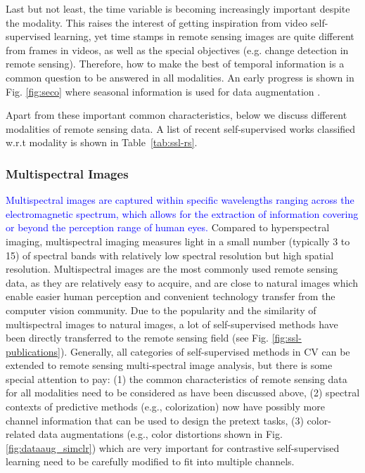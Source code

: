 \documentclass[lettersize,journal]{IEEEtran}
\begin{document}
Last but not least, the time variable is becoming increasingly important despite the modality. This raises the interest of getting inspiration from video self-supervised learning, yet time stamps in remote sensing images are quite different from frames in videos, as well as the special objectives (e.g. change detection in remote sensing). Therefore, how to make the best of temporal information is a common question to be answered in all modalities. An early progress is shown in Fig. \ref{fig:seco} where seasonal information is used for data augmentation \cite{manas2021seasonal}.

Apart from these important common characteristics, below we discuss different modalities of remote sensing data. A list of recent self-supervised works classified w.r.t modality is shown in Table~\ref{tab:ssl-rs}.





\subsubsection{Multispectral Images}

\textcolor{blue}{Multispectral images are captured within specific wavelengths ranging across the electromagnetic spectrum, which allows for the extraction of information covering or beyond the perception range of human eyes.} Compared to hyperspectral imaging, multispectral imaging measures light in a small number (typically 3 to 15) of spectral bands with relatively low spectral resolution but high spatial resolution. Multispectral images are the most commonly used remote sensing data, as they are relatively easy to acquire, and are close to natural images which enable easier human perception and convenient technology transfer from the computer vision community. Due to the popularity and the similarity of multispectral images to natural images, a lot of self-supervised methods have been directly transferred to the remote sensing field (see Fig. \ref{fig:ssl-publications}). Generally, all categories of self-supervised methods in CV can be extended to remote sensing multi-spectral image analysis, but there is some special attention to pay: (1) the common characteristics of remote sensing data for all modalities need to be considered as have been discussed above, (2) spectral contexts of predictive methods (e.g., colorization) now have possibly more channel information that can be used to design the pretext tasks, (3) color-related data augmentations (e.g., color distortions shown in Fig. \ref{fig:dataaug_simclr}) which are very important for contrastive self-supervised learning need to be carefully modified to fit into multiple channels.
\end{document}
